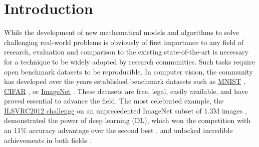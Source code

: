 \documentclass{article}
\begin{document}
\section{Introduction} %

While the development of new mathematical models and algorithms to solve challenging real-world problems is obviously of first importance to any field of research, evaluation and comparison to the existing state-of-the-art is necessary for a technique to be widely adopted by research communities. Such tasks require open benchmark datasets to be reproducible. %
In computer vision, the community has developed over the years established benchmark datasets such as \href{http://yann.lecun.com/exdb/mnist/}{MNIST} \cite{mnist}, \href{https://www.cs.toronto.edu/~kriz/cifar.html}{CIFAR} \cite{cifar}, or \href{http://www.image-net.org}{ImageNet} \cite{imagenet}. These datasets are free, legal, easily available, and have proved essential to advance the field. The most celebrated example, the \href{http://www.image-net.org/challenges/LSVRC/2012/}{ILSVRC2012 challenge} on an unprecedented ImageNet subset of 1.3M images \cite{imagenet_challenge}, demonstrated the power of deep learning (DL), which won the competition with an 11\% accuracy advantage over the second best \cite{convnet_imagenet}, and unlocked incredible achievements in both fields \cite{dl}.
\end{document}

